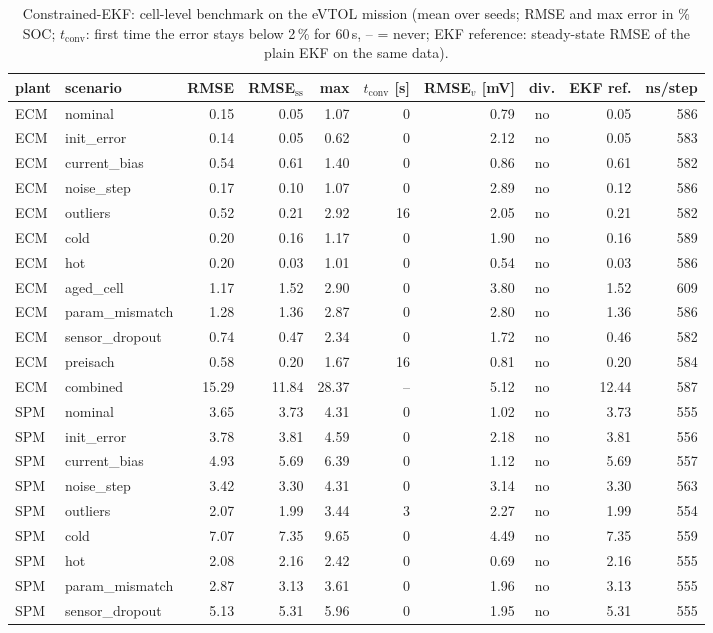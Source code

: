 \begin{table}[H]\centering\footnotesize\setlength{\tabcolsep}{4pt}
\caption{Constrained-EKF: cell-level benchmark on the eVTOL mission (mean over seeds; RMSE and max error in \% SOC; $t_\mathrm{conv}$: first time the error stays below 2\,\% for 60\,s, -- = never; EKF reference: steady-state RMSE of the plain EKF on the same data).}\label{tab:cell_ConstrainedEKF}
\begin{tabular}{llrrrrrcrr}\toprule
plant & scenario & RMSE & RMSE$_\mathrm{ss}$ & max & $t_\mathrm{conv}$ [s] & RMSE$_v$ [mV] & div. & EKF ref. & ns/step \\ \midrule
ECM & nominal & 0.15 & 0.05 & 1.07 & 0 & 0.79 & no & 0.05 & 586 \\
ECM & init\_error & 0.14 & 0.05 & 0.62 & 0 & 2.12 & no & 0.05 & 583 \\
ECM & current\_bias & 0.54 & 0.61 & 1.40 & 0 & 0.86 & no & 0.61 & 582 \\
ECM & noise\_step & 0.17 & 0.10 & 1.07 & 0 & 2.89 & no & 0.12 & 586 \\
ECM & outliers & 0.52 & 0.21 & 2.92 & 16 & 2.05 & no & 0.21 & 582 \\
ECM & cold & 0.20 & 0.16 & 1.17 & 0 & 1.90 & no & 0.16 & 589 \\
ECM & hot & 0.20 & 0.03 & 1.01 & 0 & 0.54 & no & 0.03 & 586 \\
ECM & aged\_cell & 1.17 & 1.52 & 2.90 & 0 & 3.80 & no & 1.52 & 609 \\
ECM & param\_mismatch & 1.28 & 1.36 & 2.87 & 0 & 2.80 & no & 1.36 & 586 \\
ECM & sensor\_dropout & 0.74 & 0.47 & 2.34 & 0 & 1.72 & no & 0.46 & 582 \\
ECM & preisach & 0.58 & 0.20 & 1.67 & 16 & 0.81 & no & 0.20 & 584 \\
ECM & combined & 15.29 & 11.84 & 28.37 & -- & 5.12 & no & 12.44 & 587 \\
\midrule
SPM & nominal & 3.65 & 3.73 & 4.31 & 0 & 1.02 & no & 3.73 & 555 \\
SPM & init\_error & 3.78 & 3.81 & 4.59 & 0 & 2.18 & no & 3.81 & 556 \\
SPM & current\_bias & 4.93 & 5.69 & 6.39 & 0 & 1.12 & no & 5.69 & 557 \\
SPM & noise\_step & 3.42 & 3.30 & 4.31 & 0 & 3.14 & no & 3.30 & 563 \\
SPM & outliers & 2.07 & 1.99 & 3.44 & 3 & 2.27 & no & 1.99 & 554 \\
SPM & cold & 7.07 & 7.35 & 9.65 & 0 & 4.49 & no & 7.35 & 559 \\
SPM & hot & 2.08 & 2.16 & 2.42 & 0 & 0.69 & no & 2.16 & 555 \\
SPM & param\_mismatch & 2.87 & 3.13 & 3.61 & 0 & 1.96 & no & 3.13 & 555 \\
SPM & sensor\_dropout & 5.13 & 5.31 & 5.96 & 0 & 1.95 & no & 5.31 & 555 \\
\bottomrule\end{tabular}\end{table}
